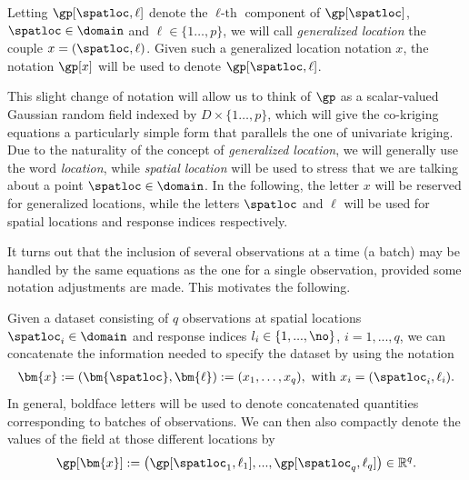 Letting $\gp[\spatloc,\ell]$ denote the $\ell\text{-th}$ component of $\gp[\spatloc]$, $\spatloc\in \domain$ and $\ell \in \{1\dots,p\}$, we will call \textit{generalized location} the couple $x=(\spatloc,\ell)$. Given such a generalized location notation $x$,  the notation $\gp[x]$ will be used to denote $\gp[\spatloc,\ell]$.

This slight change of notation will allow us to think of $\gp$ as a scalar-valued Gaussian random field 
indexed by $D\times \{1\dots,p\}$, which will give the co-kriging equations a particularly simple form that parallels the one of univariate kriging. Due to the naturality of the concept of \textit{generalized location}, 
we will generally use the word \textit{location}, while \textit{spatial location} will be used to stress that we are talking about a point $\spatloc \in \domain$. In the following, the letter $x$ will be reserved for generalized locations, while the letters $\spatloc$ and $\ell$ will be used for spatial locations and response indices respectively.

It turns out that the inclusion of several observations at a time (a batch) may be handled by the same equations as the 
one for a single observation, provided some notation adjustments are made. This motivates the following.



Given a dataset consisting of  $q$ observations at spatial locations $\spatloc_i \in \domain$ and response indices $l_i \in \lbrace 1, ..., \no\rbrace$, $i=1, ..., q$, we can concatenate the information needed to specify the dataset by using the notation
\begin{align*}
\bm{x}:=(\bm{\spatloc}, \bm{\ell}):= (x_1,\dots, x_q),~\text{with }x_i=(\spatloc_i,\ell_i).
\end{align*}
In general, boldface letters will be used to denote concatenated quantities corresponding to batches of observations. 
We can then also compactly denote the values of the field at those different locations by
\begin{align*}
\gp[\bm{x}]:=
\left(\gp[\spatloc_1,\ell_1], ...,
\gp[\spatloc_q,\ell_{q}]\right) \in \mathbb{R}^{q}.
\end{align*}
%
